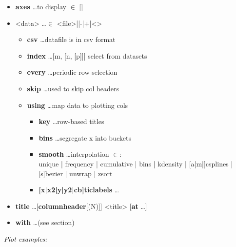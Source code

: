 {\footnotesize 
\begin{itemize}[label=|-]
\item \textbf{axes} \dots to display $\in$ []
\item <data> \dots $\in$ <file>|\textquotesingle \textquotesingle|\textquotesingle -\textquotesingle|\textquotesingle +\textquotesingle|<>
    \begin{itemize}[label=|-]
	\item \textbf{csv} \dots datafile is in csv format
	\item \textbf{index} \dots [m, [n, [p]]] select from datasets
	\item \textbf{every} \dots periodic row selection
	\item \textbf{skip} \dots used to skip col headers
	\item \textbf{using} \dots map data to plotting cols
	    \begin{itemize}[label=|-]
		\item \textbf{key} \dots row-based titles
    	\item \textbf{bins} \dots segregate x into buckets
    	\item \textbf{smooth} \dots interpolation $\in$: \\
    	   unique | frequency | cumulative | bins | kdensity | [a|m|]csplines | [s]bezier | unwrap | zsort
		\item \textbf{{[x|x2|y|y2|cb]}ticlabels} \dots 
	    \end{itemize}
    \end{itemize}
\item \textbf{title} \dots [\textbf{columnheader}[(N)]] <title> [\textbf{at} \dots]
\item \textbf{with} \dots (see  section)
\end{itemize}}
\vspace{2mm}

\textit{Plot examples:}\\
\\
\\
\\
\\
\\
\\
\\
\\
\\
\\
 

